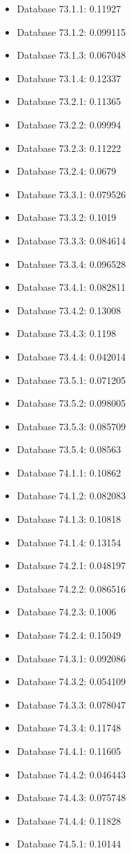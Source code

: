 \begin{itemize}
\item Database 73.1.1: 0.11927
\item Database 73.1.2: 0.099115
\item Database 73.1.3: 0.067048
\item Database 73.1.4: 0.12337
\item Database 73.2.1: 0.11365
\item Database 73.2.2: 0.09994
\item Database 73.2.3: 0.11222
\item Database 73.2.4: 0.0679
\item Database 73.3.1: 0.079526
\item Database 73.3.2: 0.1019
\item Database 73.3.3: 0.084614
\item Database 73.3.4: 0.096528
\item Database 73.4.1: 0.082811
\item Database 73.4.2: 0.13008
\item Database 73.4.3: 0.1198
\item Database 73.4.4: 0.042014
\item Database 73.5.1: 0.071205
\item Database 73.5.2: 0.098005
\item Database 73.5.3: 0.085709
\item Database 73.5.4: 0.08563
\item Database 74.1.1: 0.10862
\item Database 74.1.2: 0.082083
\item Database 74.1.3: 0.10818
\item Database 74.1.4: 0.13154
\item Database 74.2.1: 0.048197
\item Database 74.2.2: 0.086516
\item Database 74.2.3: 0.1006
\item Database 74.2.4: 0.15049
\item Database 74.3.1: 0.092086
\item Database 74.3.2: 0.054109
\item Database 74.3.3: 0.078047
\item Database 74.3.4: 0.11748
\item Database 74.4.1: 0.11605
\item Database 74.4.2: 0.046443
\item Database 74.4.3: 0.075748
\item Database 74.4.4: 0.11828
\item Database 74.5.1: 0.10144

\end{itemize}
